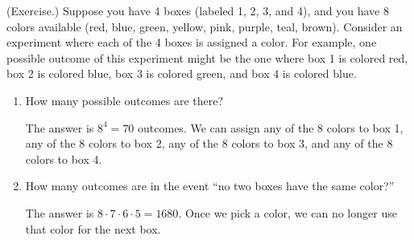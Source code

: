 \documentclass[letterpaper]{article}
\newcommand{\0}{\mathbf{0}}
\begin{document}
\begin{mdframed}
    (Exercise.) Suppose you have 4 boxes (labeled 1, 2, 3, and 4), and you have 8 colors available (red, blue, green, yellow, pink, purple, teal, brown). Consider an experiment where each of the 4 boxes is assigned a color. For example, one possible outcome of this experiment might be the one where box 1 is colored red, box 2 is colored blue, box 3 is colored green, and box 4 is colored blue.

    \begin{enumerate}
        \item How many possible outcomes are there?
        \begin{mdframed}
            The answer is $8^4 = 70$ outcomes. We can assign any of the 8 colors to box 1, any of the 8 colors to box 2, any of the 8 colors to box 3, and any of the 8 colors to box 4.   
        \end{mdframed}
        \item How many outcomes are in the event ``no two boxes have the same color?''
        \begin{mdframed}
            The answer is $8 \cdot 7 \cdot 6 \cdot 5 = 1680$. Once we pick a color, we can no longer use that color for the next box. 
        \end{mdframed}
    \end{enumerate}
\end{mdframed}
\end{document}
